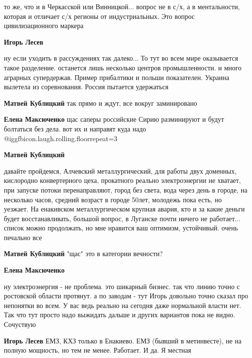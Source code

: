 \begin{itemize}
\begin{itemize}

то же, что и в Черкасской или Винницкой... вопрос не в с/х, а в ментальности,
которая и отличает с/х регионы от индустриальных. Это вопрос цивилизационного
маркера

\textbf{Игорь Лесев} 

ну если уходить в рассуждениях так далеко... То тут во всем мире оказывается
такое разделение. останется лишь несколько центров промышленности. и много
аграрных супердержав. Пример прибалтики и польши показателен. Украина вылетела
из соревнования. Россия пытается удержаться


\textbf{Матвей Кублицкий} так прямо и ждут, все вокруг заминировано

\textbf{Елена Максюченко} щас саперы российские Сирию разминируют и будут болтаться без дела. вот их и направят куда надо @igg{fbicon.laugh.rolling.floor}{repeat=3} 


\textbf{Матвей Кублицкий} 

давайте пройдемся, Алчевский металлургический, для работы двух доменных,
кислородно конвертерного цеха, прокатного реально электроэнергии не хватает,
при запуске потоки перенаправляют, город без света, вода через день в городе,
на несколько часов, средний возраст в городе 50лет, молодежь пока есть, но
уезжает. На енакивском металлургическом крупная авария, кто и за какие деньги
будет восстанавливать, большой вопрос, в Луганске почти ничего не
работает... список можно продолжать, но мне нравится ваш оптимизм, устойчивый.
очень печально все

\textbf{Матвей Кублицкий} "щас" это в категории вечности?

\textbf{Елена Максюченко} 

ну электроэнергия - не проблема. это шикарный бизнес. так что линию точно с
ростовской области протянут. а по заводам - тут Игорь довольно точно сказал про
непонятки во всем. У вас ведь реально на сегодня даже нормальной власти нет.
Так что тут просто надо выжидать дальше и других вариантов пока не видно.
Сочуствую

\textbf{Игорь Лесев} ЕМЗ, КХЗ только в Енакиево. ЕМЗ (бывший в метинвесте), не на полную мощность, но тем не менее. Работает. И да. Я местная


\end{itemize}
\end{itemize}
